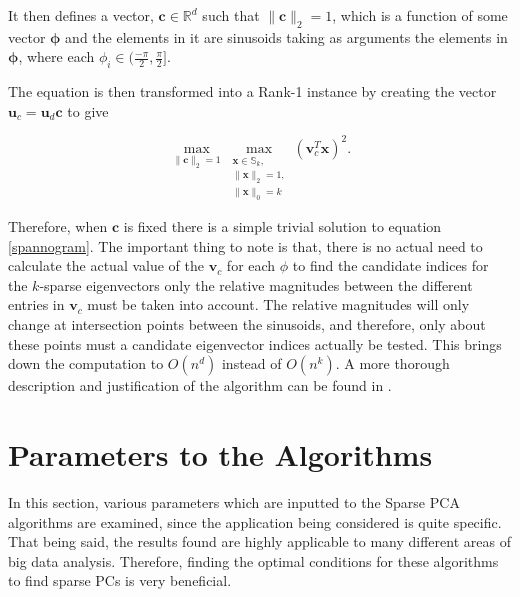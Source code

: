 \documentclass[11pt,a4paper]{article}
\begin{document}
It then defines a vector, $\mathbf{c} \in \mathbb{R}^d$ such that $\|\mathbf{c}\|_2=1$, which is a function of some vector $\mathbf{\phi}$ and the elements in it are sinusoids taking as arguments the elements in $\mathbf{\phi}$, where each $\phi_i \in (\frac{-\pi}{2}, \frac{\pi}{2}]$.

The equation is then transformed into a Rank-1 instance by creating the vector $\mathbf{u}_c = \mathbf{u}_d \mathbf{c}$ to give 

\begin{equation}
\max_{\|\mathbf{c}\|_2 =1} \max_{\substack{\mathbf{x} \in\mathbb{S}_k, \\ \|\mathbf{x}\|_2 = 1, \\ \|\mathbf{x}\|_0 = k}}\left(\mathbf{v}_c^T \mathbf{x}\right)^2.
\label{spannogram}
\end{equation}

Therefore, when $\mathbf{c}$ is fixed there is a simple trivial solution to  equation \ref{spannogram}. The important thing to note is that, there is no actual need to calculate the actual value of the $\mathbf{v}_c$ for each $\phi$ to find the candidate indices for the $k$-sparse eigenvectors only the relative magnitudes between the different entries in  $\mathbf{v}_c$ must be taken into account. The relative magnitudes will only change at intersection points between the sinusoids, and therefore, only about these points must a candidate eigenvector indices actually be tested. This brings down the computation to $O \left(n^d\right)$ instead of $O \left(n^k\right)$. A more thorough description and justification of the algorithm can be found in \cite{dimakis}.


\clearpage

\section{Parameters to the Algorithms}

In this section, various parameters which are inputted to the Sparse PCA algorithms are examined, since the application being considered is quite specific. That being said, the results found are highly applicable to many different areas of big data analysis. Therefore, finding the optimal conditions for these algorithms to find sparse PCs is very beneficial. 
\end{document}
